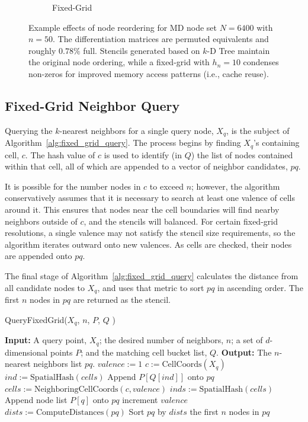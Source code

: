 \documentclass{report}
\begin{document}
\begin{figure}
\begin{subfigure}{0.425\textwidth}
\caption{Fixed-Grid}
\end{subfigure}
\caption{Example effects of node reordering for MD node set $N=6400$ with $n=50$. The differentiation matrices are permuted equivalents and roughly $0.78\%$ full. Stencils generated based on $k$-D Tree maintain the original node ordering, while a fixed-grid with $h_n=10$ condenses non-zeros for improved memory access patterns (i.e., cache reuse).}
\label{fig:reorder_example}
\end{figure} 

\subsection{Fixed-Grid Neighbor Query}

Querying the $k$-nearest neighbors for a single query node, $X_q$, is the subject of Algorithm~\ref{alg:fixed_grid_query}. The process begins by finding $X_q$'s containing cell, $c$. The hash value of $c$ is used to identify (in $Q$) the list of nodes contained within that cell, all of which are appended to a vector of neighbor candidates, $pq$. 

It is possible for the number nodes in $c$ to exceed $n$; however, the algorithm conservatively assumes that it is necessary to search at least one valence of cells around it.  This ensures that nodes near the cell boundaries will find nearby neighbors outside of $c$, and the stencils will balanced. For certain fixed-grid resolutions, a single valence may not satisfy the stencil size requirements, so the algorithm iterates outward onto new valences. As cells are checked, their nodes are appended onto $pq$. 

The final stage of Algorithm~\ref{alg:fixed_grid_query} calculates the distance from all candidate nodes to $X_q$, and uses that metric to sort $pq$ in ascending order. The first $n$ nodes in $pq$ are returned as the stencil. 
\begin{algorithm} 
\caption{QueryFixedGrid($X_q$, $n$, $P$, $Q$ )}         
\label{alg:fixed_grid_query}  
\begin{algorithmic}[1]    
    \State \textbf{Input:} A query point, $X_q$; the desired number of neighbors, $n$; a set of $d$-dimensional points $P$; and the matching cell bucket list, $Q$.
    \State \textbf{Output:} The $n$-nearest neighbors list $pq$.
    \State     
    \State $valence := 1$
    \State $c := \text{CellCoords}(X_q)$ 
    \State $ind := \text{SpatialHash}(cells)$
    \State Append $P[Q[ind]]$ onto $pq$
        \State $cells := \text{NeighboringCellCoords}(c, valence)$
        \State $inds := \text{SpatialHash}(cells)$
            \State Append node list $P[q]$ onto $pq$
            \EndIf
        \EndFor
        \State increment $valence$
    \EndWhile
    \State $dists := \text{ComputeDistances}(pq)$
    \State Sort $pq$ by $dists$
    \State \Return the first $n$ nodes in $pq$
    \end{algorithmic}
\end{algorithm}
\end{document}
